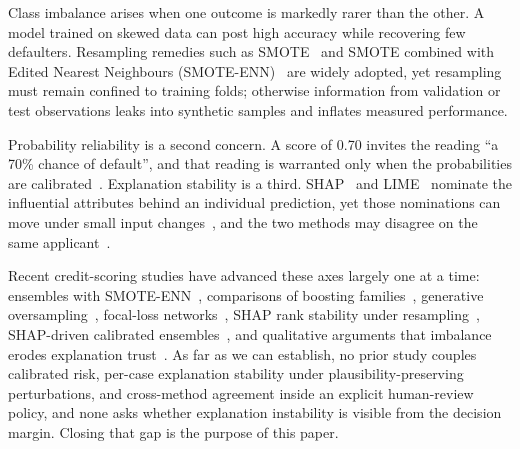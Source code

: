 \documentclass[journal]{IEEEtran}
\begin{document}
Class imbalance arises when one outcome is markedly rarer than the other. A
model trained on skewed data can post high accuracy while recovering few
defaulters. Resampling remedies such as SMOTE~\cite{chawla2002smote} and SMOTE
combined with Edited Nearest Neighbours (SMOTE-ENN)~\cite{batista2004study}
are widely adopted, yet resampling must remain confined to training folds;
otherwise information from validation or test observations leaks into
synthetic samples and inflates measured performance.

Probability reliability is a second concern. A score of 0.70 invites the
reading ``a 70\% chance of default'', and that reading is warranted only when
the probabilities are calibrated~\cite{guo2017calibration}. Explanation
stability is a third. SHAP~\cite{lundberg2017unified} and LIME~\cite{ribeiro2016why}
nominate the influential attributes behind an individual prediction, yet those
nominations can move under small input changes~\cite{alvarezmelis2018robustness,
ghorbani2019interpretation}, and the two methods may disagree on the same
applicant~\cite{krishna2022disagreement}.

Recent credit-scoring studies have advanced these axes largely one at a time:
ensembles with SMOTE-ENN~\cite{aruleba2024credit,aruleba2025improved},
comparisons of boosting families~\cite{nguyen2025comparative}, generative
oversampling~\cite{kwon2026generative}, focal-loss networks~\cite{chab2026csanet},
SHAP rank stability under resampling~\cite{shawabkeh2026explainable},
SHAP-driven calibrated ensembles~\cite{japinye2025explainable}, and qualitative
arguments that imbalance erodes explanation trust~\cite{tufail2026signal}. As
far as we can establish, no prior study couples calibrated risk, per-case
explanation stability under plausibility-preserving perturbations, and
cross-method agreement inside an explicit human-review policy, and none asks
whether explanation instability is visible from the decision margin. Closing
that gap is the purpose of this paper.
\end{document}
